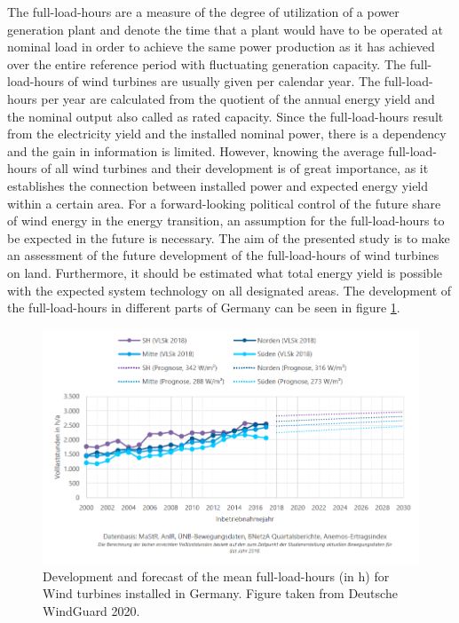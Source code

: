 \documentclass[a4paper,11pt]{article}
\begin{document}
The full-load-hours are a measure of the degree of utilization of a power generation plant and denote the time that a plant would have to be operated at nominal load in order to achieve the same power production as it has achieved over the entire reference period with fluctuating generation capacity. The full-load-hours of wind turbines are usually given per calendar year. The full-load-hours per year are calculated from the quotient of the annual energy yield and the nominal output also called as rated capacity. Since the full-load-hours result from the electricity yield and the installed nominal power, there is a dependency and the gain in information is limited. However, knowing the average full-load-hours of all wind turbines and their development is of great importance, as it establishes the connection between installed power and expected energy yield within a certain area. For a forward-looking political control of the future share of wind energy in the energy transition, an assumption for the full-load-hours to be expected in the future is necessary. The aim of the presented study is to make an assessment of the future development of the full-load-hours of wind turbines on land. Furthermore, it should be estimated what total energy yield is possible with the expected system technology on all designated areas. The development of the full-load-hours in different parts of Germany can be seen in figure \ref{fig:flh}.
\begin{figure}

{\centering \includegraphics[width=1\linewidth]{figures/DWG/DWG_Volllaststunden} 

}

\caption{Development and forecast of the mean full-load-hours (in h) for Wind turbines installed in Germany. Figure taken from Deutsche WindGuard 2020.}\label{fig:flh}
\end{figure}
\end{document}
